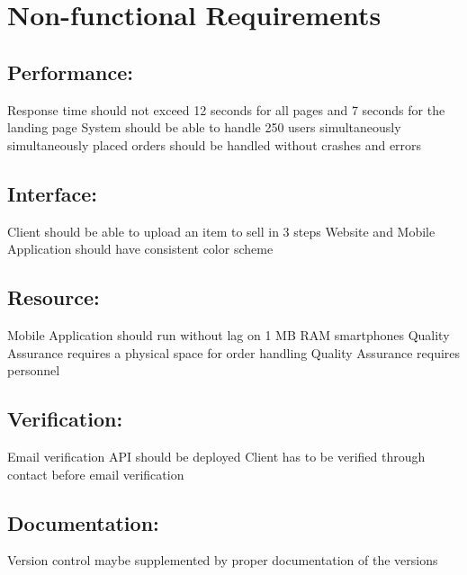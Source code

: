 
\section{Non-functional Requirements}

\subsection*{Performance:}
\begin{outline}
    \1 Response time should not exceed 12 seconds for all pages and 7 seconds for the landing page
    \1 System should be able to handle 250 users simultaneously
     simultaneously placed orders should be handled without crashes and errors
\end{outline}

\subsection*{Interface:}
\begin{outline}
    \1 Client should be able to upload an item to sell in 3 steps
    \1 Website and Mobile Application should have consistent color scheme
\end{outline}

\subsection*{Resource:}
\begin{outline}
    \1 Mobile Application should run without lag on 1 MB RAM smartphones
    \1 Quality Assurance requires a physical space for order handling
    \1 Quality Assurance requires personnel
\end{outline}

\subsection*{Verification:}
\begin{outline}
    \1 Email verification API should be deployed
    \2 Client has to be verified through contact before email verification
\end{outline}

\subsection*{Documentation:}
\begin{outline}
    \1 Version control maybe supplemented by proper documentation of the versions
\end{outline}

